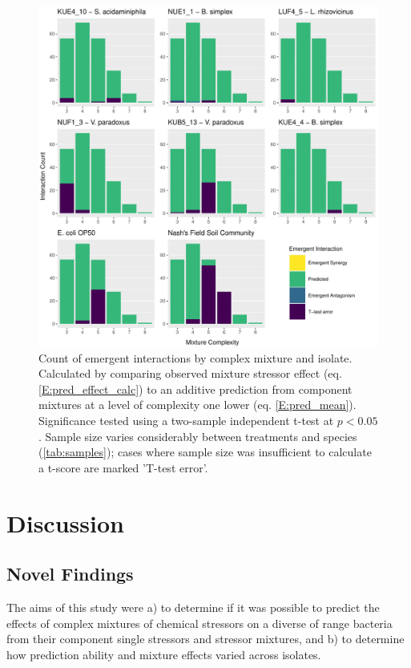 \documentclass[10pt]{article}
\begin{document}
\begin{figure}[H]
    \centering
    \includegraphics[width = \textwidth]{Scripts/Results/Final_Pipeline/histogram_interaction_emergent.pdf}
    \caption{Count of emergent interactions by complex mixture and isolate. Calculated by comparing observed mixture stressor effect (eq. \ref{E:pred_effect_calc}) to an additive prediction from component mixtures at a level of complexity one lower (eq. \ref{E:pred_mean}). Significance tested using a two-sample independent t-test at $p < 0.05$. Sample size varies considerably between treatments and species (\cref{tab:samples}); cases where sample size was insufficient to calculate a t-score are marked 'T-test error'.}
    \label{fig:histogram_interaction_emergent}
\end{figure}

\newpage
\section{Discussion}
\label{S:4}

\subsection{Novel Findings}
\label{S:4:1}

The aims of this study were a) to determine if it was possible to predict the effects of complex mixtures of chemical stressors on a diverse of range bacteria from their component single stressors and stressor mixtures, and b) to determine how prediction ability and mixture effects varied across isolates.
\end{document}
